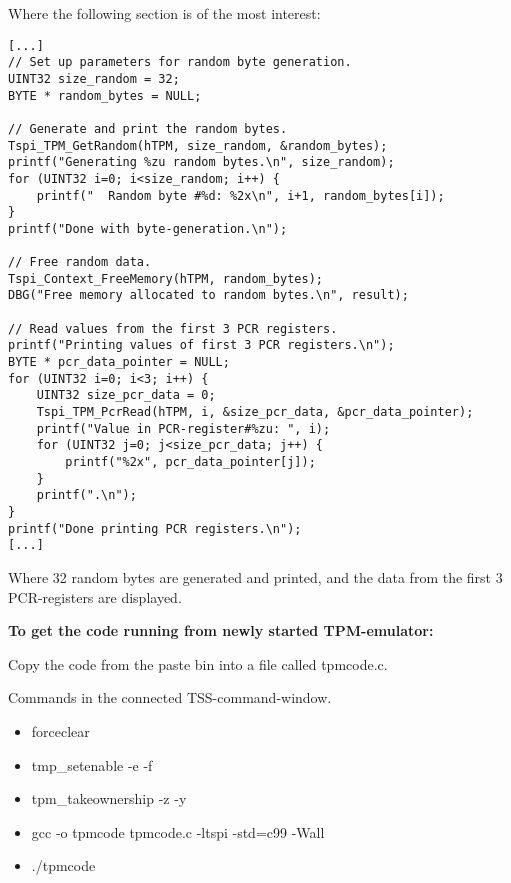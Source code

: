 \documentclass[10pt]{article}
\begin{document}
Where the following section is of the most interest:

\begin{lstlisting}
[...]
// Set up parameters for random byte generation.
UINT32 size_random = 32;
BYTE * random_bytes = NULL;

// Generate and print the random bytes.
Tspi_TPM_GetRandom(hTPM, size_random, &random_bytes);
printf("Generating %zu random bytes.\n", size_random);
for (UINT32 i=0; i<size_random; i++) {
    printf("  Random byte #%d: %2x\n", i+1, random_bytes[i]);
}
printf("Done with byte-generation.\n");

// Free random data.
Tspi_Context_FreeMemory(hTPM, random_bytes);
DBG("Free memory allocated to random bytes.\n", result);

// Read values from the first 3 PCR registers.
printf("Printing values of first 3 PCR registers.\n");
BYTE * pcr_data_pointer = NULL;
for (UINT32 i=0; i<3; i++) {
    UINT32 size_pcr_data = 0;
    Tspi_TPM_PcrRead(hTPM, i, &size_pcr_data, &pcr_data_pointer);
    printf("Value in PCR-register#%zu: ", i);
    for (UINT32 j=0; j<size_pcr_data; j++) {
        printf("%2x", pcr_data_pointer[j]);
    }
    printf(".\n");
}
printf("Done printing PCR registers.\n");
[...]
\end{lstlisting}

Where 32 random bytes are generated and printed, and the data from the first 3 PCR-registers
are displayed.

\textbf{To get the code running from newly started TPM-emulator:}

Copy the code from the paste bin into a file called tpmcode.c.

Commands in the connected TSS-command-window.
\begin{itemize}
  \item{forceclear}
  \item{tmp\_setenable -e -f}
  \item{tpm\_takeownership -z -y}
  \item{gcc -o tpmcode tpmcode.c -ltspi -std=c99 -Wall}
  \item{./tpmcode}
\end{itemize}
\end{document}
